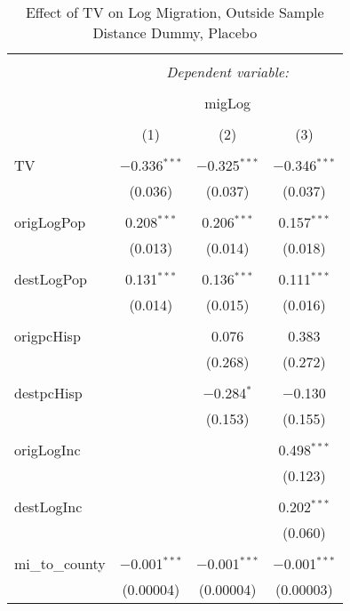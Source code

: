 
\begin{table}[!htbp] \centering 
  \caption{Effect of TV on Log Migration, Outside Sample Distance Dummy, Placebo} 
  \label{} 
\begin{tabular}{@{\extracolsep{5pt}}lccc} 
\\[-1.8ex]\hline 
\hline \\[-1.8ex] 
 & \multicolumn{3}{c}{\textit{Dependent variable:}} \\ 
\cline{2-4} 
\\[-1.8ex] & \multicolumn{3}{c}{migLog} \\ 
\\[-1.8ex] & (1) & (2) & (3)\\ 
\hline \\[-1.8ex] 
 TV & $-$0.336$^{***}$ & $-$0.325$^{***}$ & $-$0.346$^{***}$ \\ 
  & (0.036) & (0.037) & (0.037) \\ 
  & & & \\ 
 origLogPop & 0.208$^{***}$ & 0.206$^{***}$ & 0.157$^{***}$ \\ 
  & (0.013) & (0.014) & (0.018) \\ 
  & & & \\ 
 destLogPop & 0.131$^{***}$ & 0.136$^{***}$ & 0.111$^{***}$ \\ 
  & (0.014) & (0.015) & (0.016) \\ 
  & & & \\ 
 origpcHisp &  & 0.076 & 0.383 \\ 
  &  & (0.268) & (0.272) \\ 
  & & & \\ 
 destpcHisp &  & $-$0.284$^{*}$ & $-$0.130 \\ 
  &  & (0.153) & (0.155) \\ 
  & & & \\ 
 origLogInc &  &  & 0.498$^{***}$ \\ 
  &  &  & (0.123) \\ 
  & & & \\ 
 destLogInc &  &  & 0.202$^{***}$ \\ 
  &  &  & (0.060) \\ 
  & & & \\ 
 mi\_to\_county & $-$0.001$^{***}$ & $-$0.001$^{***}$ & $-$0.001$^{***}$ \\ 
  & (0.00004) & (0.00004) & (0.00003) \\ 

\end{tabular}
\end{table}
